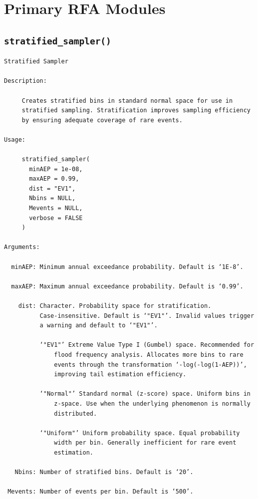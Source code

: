 \documentclass[
  letterpaper,
  DIV=11,
  numbers=noendperiod]{scrreprt}
\begin{document}
\section{Primary RFA Modules}\label{primary-rfa-modules}

\subsection{\texorpdfstring{\texttt{stratified\_sampler()}}{stratified\_sampler()}}\label{stratified_sampler}

\begin{verbatim}
Stratified Sampler

Description:

     Creates stratified bins in standard normal space for use in
     stratified sampling. Stratification improves sampling efficiency
     by ensuring adequate coverage of rare events.

Usage:

     stratified_sampler(
       minAEP = 1e-08,
       maxAEP = 0.99,
       dist = "EV1",
       Nbins = NULL,
       Mevents = NULL,
       verbose = FALSE
     )
     
Arguments:

  minAEP: Minimum annual exceedance probability. Default is ‘1E-8’.

  maxAEP: Maximum annual exceedance probability. Default is ‘0.99’.

    dist: Character. Probability space for stratification.
          Case-insensitive. Default is ‘"EV1"’. Invalid values trigger
          a warning and default to ‘"EV1"’.

          ‘"EV1"’ Extreme Value Type I (Gumbel) space. Recommended for
              flood frequency analysis. Allocates more bins to rare
              events through the transformation ‘-log(-log(1-AEP))’,
              improving tail estimation efficiency.

          ‘"Normal"’ Standard normal (z-score) space. Uniform bins in
              z-space. Use when the underlying phenomenon is normally
              distributed.

          ‘"Uniform"’ Uniform probability space. Equal probability
              width per bin. Generally inefficient for rare event
              estimation.

   Nbins: Number of stratified bins. Default is ‘20’.

 Mevents: Number of events per bin. Default is ‘500’.


\end{verbatim}
\end{document}
